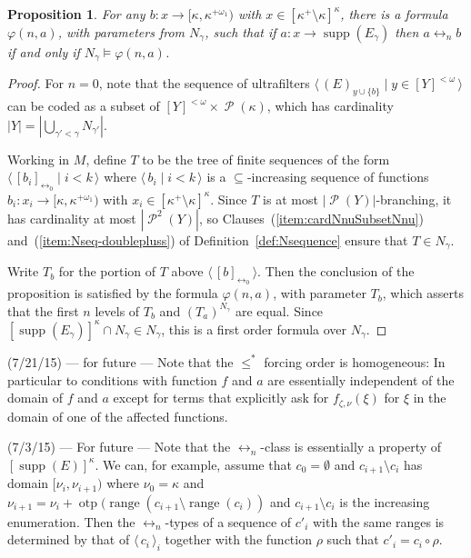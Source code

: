 \documentclass[
twoside,
]{article}
\newtheorem{proposition}[theorem]{Proposition}
\theoremstyle{definition}
\theoremstyle{remark}
\newcommand{\ufFromExt}[2]{(#1)_{#2}}
\DeclareMathOperator{\supp}{supp}   %
\DeclareMathOperator{\otp}{otp}
\newcommand\gkeq{\leftrightarrow}
\DeclareMathOperator{\ps}{\mathcal{P}}
\renewcommand{\phi}{\varphi}
\newcommand{\sing}[1]{\{#1\}}
\newcommand{\pair}[1]{\langle#1\rangle}
\newcommand{\seq}[1]{\pair{\,#1\,}}
\newcommand{\card}[1]{|#1|}
\DeclareMathOperator{\range}{range}
\begin{document}
  \begin{proposition}
    \label{thm:gkeq0inNgamma}
    For any $b\colon x\to [\kappa,\kappa^{+\omega_1})$ with $x\in
    [\kappa^{+}\setminus\kappa]^{\kappa}$, there is a
    formula $\phi(n,a)$, with parameters from $N_{\gamma}$, such that if 
    $a\colon x\to\supp(E_{\gamma})$ then 
    $a\gkeq _n b$ if and only if $N_\gamma\models \phi(n,a)$.
  \end{proposition}
  \begin{proof}
    For $n=0$, note that 
    the sequence of ultrafilters $\seq{\ufFromExt{E}{y\cup\sing{b}}\mid y\in
      [Y]^{<\omega}}$ can be coded as a subset of $[Y]^{<\omega}\times
    \ps(\kappa)$, which has cardinality $\card
    Y=\card{\bigcup_{\gamma'<\gamma}N_{\gamma'}}$.

    Working in $M$, define $T$ to be the tree
    of finite sequences of the form $\seq{[b_i]_{\gkeq_0}\mid i<k}$
    where $\seq{b_i\mid i<k}$ is a $\subseteq$-increasing sequence of
    functions $b_i\colon x_i\to[\kappa,\kappa^{+\omega_1})$ with  $x_i\in
    [\kappa^{+}\setminus\kappa]^{\kappa}$. 
    Since $T$ is at most $\card{\ps(Y)}$-branching,
    it has cardinality at most $\card {\ps^{2}(Y)}$, so
    Clauses~(\ref{item:cardNnuSubsetNnu}) 
    and~(\ref{item:Nseq-doublepluss}) of
    Definition~\ref{def:Nsequence} ensure that $T\in N_{\gamma}$.

    Write $T_{b}$ for the portion of $T$ above $\seq{[b]_{\gkeq_0}}$.
    Then  the conclusion of the proposition is satisfied by the
    formula $\phi(n,a)$, with parameter $T_{b}$, 
    which asserts that the first $n$ levels of $T_{b}$ and
    $(T_{a})^{N_\gamma}$ are equal.   Since
    $[\supp(E_\gamma)]^{\kappa}\cap N_\gamma\in N_\gamma$, this is a
    first order formula over $N_\gamma$.
  \end{proof}
  \begin{todoenv}
    (7/21/15) --- for future --- Note that the $\le^*$ forcing order
    is homogeneous: In particular to conditions with function $f$ and
    $a$ are essentially independent of the domain of $f$ and $a$
    except for terms that explicitly ask for $f_{\zeta,\nu}(\xi)$ for
    $\xi$ in the domain of one of the affected functions.
  \end{todoenv}
  \begin{todoenv}
    (7/3/15) --- For future --- Note that the $\gkeq_{n}$-class is
    essentially a property of $[\supp(E)]^{\kappa}$.    We can, for
    example, assume that $c_0=\emptyset$ and $c_{i+1}\setminus c_i$
    has domain 
    $[\nu_i,\nu_{i+1})$ where $\nu_0=\kappa$ and $\nu_{i+1}=\nu_i
    +\otp(\range(c_{i+1}\setminus\range(c_{i}))$ and $c_{i+1}\setminus
    c_{i}$ is the increasing enumeration.   Then the $\gkeq_{n}$-types
    of a sequence of $c'_i$ with the same ranges is determined by that
    of $\seq{c_i}_i$ together with the function $\rho$ such that
    $c'_i=c_i\circ \rho$.
  \end{todoenv}
\end{document}
